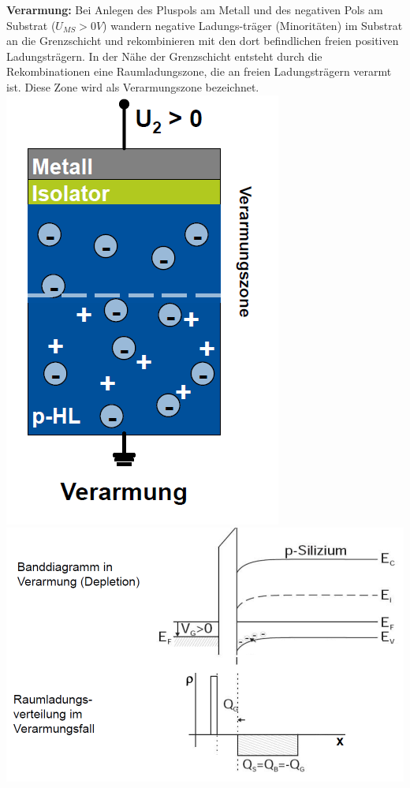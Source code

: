 		\textbf{Verarmung:}
		\newline
		Bei Anlegen des Pluspols am Metall und
		des negativen Pols am Substrat ($U_{MS} > 0V$) wandern negative Ladungs-träger
		(Minoritäten) im Substrat an die Grenzschicht und rekombinieren mit den dort befindlichen freien positiven Ladungsträgern.
		\newline 
		In der Nähe der Grenzschicht entsteht durch die Rekombinationen eine 		Raumladungszone, die an freien 		Ladungsträgern verarmt ist. Diese Zone wird als Verarmungszone bezeichnet.
		\newline
		\includegraphics[width=0.25\linewidth]{Kapitel/Kap06/Verarmungszone1}
		\includegraphics[width=0.60\linewidth]{Kapitel/Kap06/Verarmungszone2}
		
